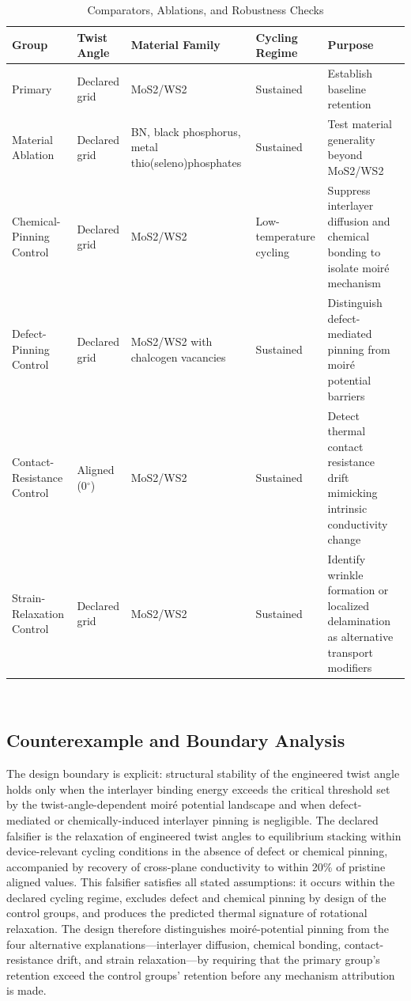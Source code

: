 \documentclass[conference]{IEEEtran}
\begin{document}
\begin{table}[htbp]
\centering
\footnotesize
\setlength{\tabcolsep}{3pt}
\renewcommand{\arraystretch}{1.12}
\caption{Comparators, Ablations, and Robustness Checks}
\label{tab:study-design-and-methods-b2-comparison}
\begin{tabular}{|p{}|p{}|p{}|p{}|p{}|}
\hline
Group & Twist Angle & Material Family & Cycling Regime & Purpose \\\hline
Primary & Declared grid & MoS2/WS2 & Sustained & Establish baseline retention \\\hline
Material Ablation & Declared grid & BN, black phosphorus, metal thio(seleno)phosphates & Sustained & Test material generality beyond MoS2/WS2 \\\hline
Chemical-Pinning Control & Declared grid & MoS2/WS2 & Low-temperature cycling & Suppress interlayer diffusion and chemical bonding to isolate moiré mechanism \\\hline
Defect-Pinning Control & Declared grid & MoS2/WS2 with chalcogen vacancies & Sustained & Distinguish defect-mediated pinning from moiré potential barriers \\\hline
Contact-Resistance Control & Aligned (0$^\circ$) & MoS2/WS2 & Sustained & Detect thermal contact resistance drift mimicking intrinsic conductivity change \\\hline
Strain-Relaxation Control & Declared grid & MoS2/WS2 & Sustained & Identify wrinkle formation or localized delamination as alternative transport modifiers \\\hline
\end{tabular}
\end{table}~\cite{cite_26ecaf73d88dfe33,cite_54b9175b8bb4c4e0,cite_78dc2ce387cb7c90,cite_a411cbbebf7838b9,cite_b9cc1fcb55e94349}

\subsection{Counterexample and Boundary Analysis}
The design boundary is explicit: structural stability of the engineered twist angle holds only when the interlayer binding energy exceeds the critical threshold set by the twist-angle-dependent moiré potential landscape and when defect-mediated or chemically-induced interlayer pinning is negligible. The declared falsifier is the relaxation of engineered twist angles to equilibrium stacking within device-relevant cycling conditions in the absence of defect or chemical pinning, accompanied by recovery of cross-plane conductivity to within 20\% of pristine aligned values. This falsifier satisfies all stated assumptions: it occurs within the declared cycling regime, excludes defect and chemical pinning by design of the control groups, and produces the predicted thermal signature of rotational relaxation. The design therefore distinguishes moiré-potential pinning from the four alternative explanations---interlayer diffusion, chemical bonding, contact-resistance drift, and strain relaxation---by requiring that the primary group's retention exceed the control groups' retention before any mechanism attribution is made.~\cite{cite_26ecaf73d88dfe33}
\end{document}
